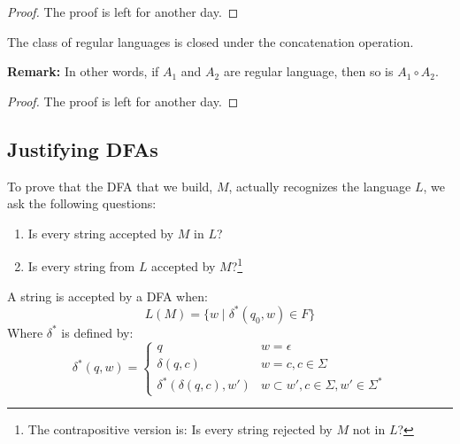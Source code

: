 \documentclass[letterpaper]{article}
\begin{document}
\begin{mdframed}[]
    \begin{proof}
        The proof is left for another day.
    \end{proof}
\end{mdframed}

\begin{theorem}{}{}
    The class of regular languages is closed under the concatenation operation.
\end{theorem}
\textbf{Remark:} In other words, if $A_1$ and $A_2$ are regular language, then so is $A_1 \circ A_2$.

\begin{mdframed}[]
    \begin{proof}
        The proof is left for another day.
    \end{proof}
\end{mdframed}

\subsection{Justifying DFAs}
To prove that the DFA that we build, $M$, actually recognizes the language $L$, we ask the following questions: 
\begin{enumerate}
    \item Is every string accepted by $M$ in $L$?
    \item Is every string from $L$ accepted by $M$?\footnote{The contrapositive version is: Is every string rejected by $M$ not in $L$?}
\end{enumerate}
A string is accepted by a DFA when: 
\[ L(M) = \{ w \mid \delta^{*}(q_0, w) \in F \} \]
Where $\delta^*$ is defined by: 
\[\delta^{*}(q, w) = \begin{cases}
    q & w = \epsilon \\ 
    \delta(q, c) & w = c, c \in \Sigma \\ 
    \delta^{*}(\delta(q, c), w') & w \subset w', c \in \Sigma, w' \in \Sigma^*
\end{cases}\]
\end{document}

